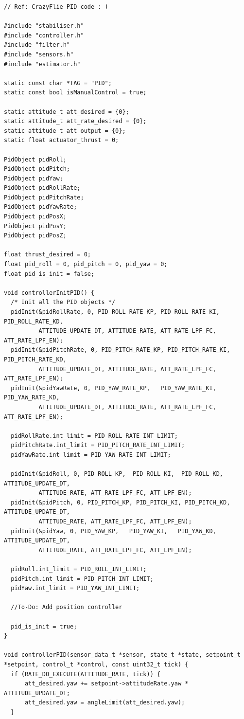 \begin{lstlisting}
// Ref: CrazyFlie PID code : ) 

#include "stabiliser.h"
#include "controller.h"
#include "filter.h"
#include "sensors.h"
#include "estimator.h"

static const char *TAG = "PID";
static const bool isManualControl = true;

static attitude_t att_desired = {0};
static attitude_t att_rate_desired = {0};
static attitude_t att_output = {0};
static float actuator_thrust = 0;

PidObject pidRoll;
PidObject pidPitch;
PidObject pidYaw;
PidObject pidRollRate;
PidObject pidPitchRate;
PidObject pidYawRate;
PidObject pidPosX;
PidObject pidPosY;
PidObject pidPosZ;

float thrust_desired = 0; 
float pid_roll = 0, pid_pitch = 0, pid_yaw = 0; 
float pid_is_init = false; 

void controllerInitPID() {
  /* Init all the PID objects */
  pidInit(&pidRollRate, 0, PID_ROLL_RATE_KP, PID_ROLL_RATE_KI, PID_ROLL_RATE_KD,
          ATTITUDE_UPDATE_DT, ATTITUDE_RATE, ATT_RATE_LPF_FC, ATT_RATE_LPF_EN);
  pidInit(&pidPitchRate, 0, PID_PITCH_RATE_KP, PID_PITCH_RATE_KI, PID_PITCH_RATE_KD,
          ATTITUDE_UPDATE_DT, ATTITUDE_RATE, ATT_RATE_LPF_FC, ATT_RATE_LPF_EN);
  pidInit(&pidYawRate, 0, PID_YAW_RATE_KP,   PID_YAW_RATE_KI,   PID_YAW_RATE_KD,
          ATTITUDE_UPDATE_DT, ATTITUDE_RATE, ATT_RATE_LPF_FC, ATT_RATE_LPF_EN);
  
  pidRollRate.int_limit = PID_ROLL_RATE_INT_LIMIT; 
  pidPitchRate.int_limit = PID_PITCH_RATE_INT_LIMIT;
  pidYawRate.int_limit = PID_YAW_RATE_INT_LIMIT;

  pidInit(&pidRoll, 0, PID_ROLL_KP,  PID_ROLL_KI,  PID_ROLL_KD, ATTITUDE_UPDATE_DT,
          ATTITUDE_RATE, ATT_RATE_LPF_FC, ATT_LPF_EN);
  pidInit(&pidPitch, 0, PID_PITCH_KP, PID_PITCH_KI, PID_PITCH_KD, ATTITUDE_UPDATE_DT,
          ATTITUDE_RATE, ATT_RATE_LPF_FC, ATT_LPF_EN);
  pidInit(&pidYaw, 0, PID_YAW_KP,   PID_YAW_KI,   PID_YAW_KD, ATTITUDE_UPDATE_DT,
          ATTITUDE_RATE, ATT_RATE_LPF_FC, ATT_LPF_EN);

  pidRoll.int_limit = PID_ROLL_INT_LIMIT; 
  pidPitch.int_limit = PID_PITCH_INT_LIMIT;
  pidYaw.int_limit = PID_YAW_INT_LIMIT;

  //To-Do: Add position controller

  pid_is_init = true;
}

void controllerPID(sensor_data_t *sensor, state_t *state, setpoint_t *setpoint, control_t *control, const uint32_t tick) {
  if (RATE_DO_EXECUTE(ATTITUDE_RATE, tick)) {
      att_desired.yaw += setpoint->attitudeRate.yaw * ATTITUDE_UPDATE_DT;
      att_desired.yaw = angleLimit(att_desired.yaw); 
  }


\end{lstlisting}
